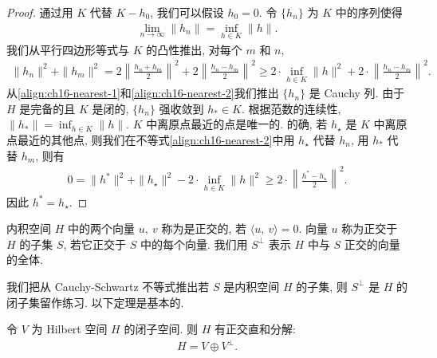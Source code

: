 \documentclass[../../main.tex]{subfiles}
\begin{document}
\begin{proof}
通过用 $K$ 代替 $K-h_{0}$, 我们可以假设 $h_{0}=0$. 令 $\{h_{n}\}$ 为 $K$ 中的序列使得
\begin{align}
\lim_{n\to\infty}\|h_{n}\|=\inf_{h\in K}\|h\|.\label{align:ch16-nearest-1}
\end{align}
我们从平行四边形等式与 $K$ 的凸性推出, 对每个 $m$ 和 $n$,
\begin{align}
\|h_{n}\|^{2}+\|h_{m}\|^{2}=2\left\|\frac{h_{n}+h_{m}}{2}\right\|^{2}+2\left\|\frac{h_{n}-h_{m}}{2}\right\|^{2}\geqslant 2\cdot\inf_{h\in K}\|h\|^{2}+2\cdot\left\|\frac{h_{n}-h_{m}}{2}\right\|^{2}.\label{align:ch16-nearest-2}
\end{align}
从\eqref{align:ch16-nearest-1}和\eqref{align:ch16-nearest-2}我们推出 $\{h_{n}\}$ 是 Cauchy 列. 由于 $H$ 是完备的且 $K$ 是闭的, $\{h_{n}\}$ 强收敛到 $h_{*}\in K$. 根据范数的连续性, $\|h_{*}\|=\inf_{h\in K}\|h\|$. $K$ 中离原点最近的点是唯一的. 的确, 若 $h_{\star}$ 是 $K$ 中离原点最近的其他点, 则我们在不等式\eqref{align:ch16-nearest-2}中用 $h_{\star}$ 代替 $h_{n}$, 用 $h_{*}$ 代替 $h_{m}$, 则有
\begin{align*}
0=\|h^{*}\|^{2}+\|h_{\star}\|^{2}-2\cdot\inf_{h\in K}\|h\|^{2}\geqslant 2\cdot\left\|\frac{h^{*}-h_{\star}}{2}\right\|^{2}.
\end{align*}
因此 $h^{*}=h_{\star}$.
\end{proof}

\begin{definition}[正交]\label{definition:ch16-orthogonal}
内积空间 $H$ 中的两个向量 $u,\ v$ 称为是正交的, 若 $\langle u,\ v\rangle=0$. 向量 $u$ 称为正交于 $H$ 的子集 $S$, 若它正交于 $S$ 中的每个向量. 我们用 $S^{\perp}$ 表示 $H$ 中与 $S$ 正交的向量的全体.
\end{definition}

我们把从 Cauchy-Schwartz 不等式推出若 $S$ 是内积空间 $H$ 的子集, 则 $S^{\perp}$ 是 $H$ 的闭子集留作练习. 以下定理是基本的.

\begin{theorem}[正交直和分解]\label{theorem:ch16-orthogonal-decomposition}
令 $V$ 为 Hilbert 空间 $H$ 的闭子空间. 则 $H$ 有正交直和分解:
\begin{align}
H=V\oplus V^{\perp}.\label{align:ch16-decomposition}
\end{align}
\end{theorem}
\end{document}
